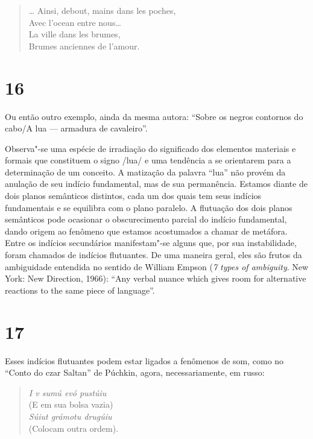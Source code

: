 \begin{verse}
\ldots{} Ainsi, debout, mains dans les poches, \\
Avec l'ocean entre nous\ldots{} \\
La ville dans les brumes, \\
Brumes anciennes de l'amour.
\end{verse}

\section{16}

Ou então outro exemplo, ainda da mesma autora: ``Sobre os negros contornos
do cabo/A lua --- armadura de cavaleiro''.

Observa"-se uma espécie de irradiação do significado dos elementos
materiais e formais que constituem o signo /lua/ e uma tendência a se
orientarem para a determinação de um conceito. A matização da palavra
``lua'' não provém da anulação de seu indício fundamental, mas de sua
permanência. Estamos diante de dois planos semânticos distintos, cada um
dos quais tem seus indícios fundamentais e se equilibra com o plano
paralelo. A flutuação dos dois planos semânticos pode ocasionar o
obscurecimento parcial do indício fundamental, dando origem ao fenômeno
que estamos acostumados a chamar de metáfora. Entre os indícios
secundários manifestam"-se alguns que, por sua instabilidade, foram
chamados de indícios flutuantes. De uma maneira geral, eles são frutos
da ambiguidade entendida no sentido de William Empson (\emph{7 types of ambiguity}. New York: New Direction, 1966): ``Any
verbal nuance which gives room for alternative reactions to the same
piece of language''.

\section{17}

Esses indícios flutuantes podem estar ligados a fenômenos de som, como
no ``Conto do czar Saltan'' de Púchkin, agora, necessariamente, em
russo:

\begin{verse}
\emph{I v sumú evó pustúiu} \\
(E em sua bolsa vazia) \\[8pt]

\emph{Súiut grámotu drugúiu} \\
(Colocam outra ordem).
\end{verse}

